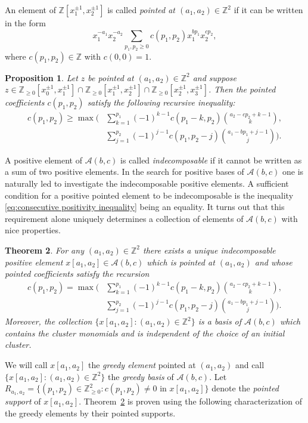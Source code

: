 \documentclass[10pt]{amsart}
\newtheorem{theorem}{Theorem}[section]
\newtheorem{prop}[theorem]{Proposition}
\theoremstyle{remark}
\numberwithin{equation}{section}
\newcommand{\ZZ}{\mathbb{Z}}
\newcommand{\cA}{\mathcal{A}}
\begin{document}
An element of $\ZZ[x_1^{\pm1},x_2^{\pm1}]$ is called \emph{pointed at
$(a_1,a_2)\in\ZZ^2$} if it can be written in the form
\[
  x_1^{-a_1}x_2^{-a_2}\sum\limits_{p_1,p_2\ge0}c(p_1,p_2)x_1^{bp_1}x_2^{cp_2},
\]
where $c(p_1,p_2)\in\ZZ$ with $c(0,0)=1$.   
\begin{prop}\cite[Proposition~1.5]{LLZ}
  Let $z$ be pointed at $(a_1,a_2)\in\ZZ^2$ and suppose
  $z\in\ZZ_{\ge0}[x_0^{\pm1},x_1^{\pm1}]
  \cap\ZZ_{\ge0}[x_1^{\pm1},x_2^{\pm1}]
  \cap\ZZ_{\ge0}[x_2^{\pm1},x_3^{\pm1}]$.
  Then the pointed coefficients $c(p_1,p_2)$ satisfy the following recursive
  inequality:
  \begin{align}
    \label{eq:consecutive positivity inequality}
    c(p_1,p_2)\ge\max\bigg(
    &\sum\limits_{k=1}^{p_1} (-1)^{k-1}c(p_1-k,p_2){a_2-cp_2+k-1\choose k},\\
    \nonumber&\sum\limits_{ j =1}^{p_2} (-1)^{ j -1}c(p_1,p_2- j ){a_1-bp_1+ j -1\choose  j }\bigg).
  \end{align}
\end{prop}
A positive element of $\cA(b,c)$ is called \emph{indecomposable} if it cannot
be written as a sum of two positive elements.  In the search for positive bases
of $\cA(b,c)$ one is naturally led to investigate the indecomposable positive
elements.  A sufficient condition for a positive pointed element to be
indecomposable is the inequality \eqref{eq:consecutive positivity inequality}
being an equality.  It turns out that this requirement alone uniquely determines
a collection of elements of $\cA(b,c)$ with nice properties.

\begin{theorem}\label{th:greedy}\cite[Theorem~1.7]{LLZ}
  For any $(a_1,a_2)\in\ZZ^2$ there exists a unique indecomposable positive
  element $x[a_1,a_2]\in\cA(b,c)$ which is pointed at $(a_1,a_2)$ and whose
  pointed coefficients satisfy the recursion
  \begin{align}
    \label{eq:greey recursion}
    c(p_1,p_2)=\max\bigg(
    &\sum\limits_{k=1}^{p_1} (-1)^{k-1}c(p_1-k,p_2){a_2-cp_2+k-1\choose k},\\
    \nonumber&\sum\limits_{ j =1}^{p_2} (-1)^{ j -1}c(p_1,p_2- j ){a_1-bp_1+ j -1\choose  j }\bigg).
  \end{align}
  Moreover, the collection $\{x[a_1,a_2]:(a_1,a_2)\in\ZZ^2\}$ is a basis of
  $\cA(b,c)$ which contains the cluster monomials and is independent of the
  choice of an initial cluster.
\end{theorem}
We will call $x[a_1,a_2]$ the \emph{greedy element} pointed at $(a_1,a_2)$ and
call $\{x[a_1,a_2]:(a_1,a_2)\in\ZZ^2\}$ the \emph{greedy basis} of $\cA(b,c)$.  Let
$R_{a_1,a_2}=\{(p_1,p_2)\in\ZZ_{\ge0}^2:c(p_1,p_2)\ne0 \text{ in } x[a_1,a_2]\}$ denote
the \emph{pointed support} of $x[a_1,a_2]$.  Theorem~\ref{th:greedy} is proven using the following characterization of the greedy elements by their
pointed supports.
\end{document}
